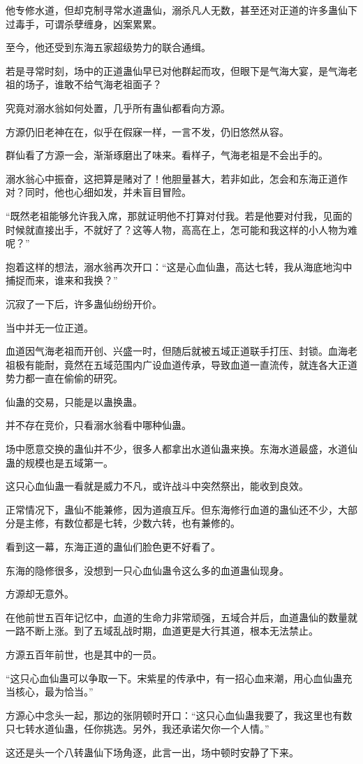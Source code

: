 \begin{this_body}
他专修水道，但却克制寻常水道蛊仙，溺杀凡人无数，甚至还对正道的许多蛊仙下过毒手，可谓杀孽缠身，凶案累累。

至今，他还受到东海五家超级势力的联合通缉。

若是寻常时刻，场中的正道蛊仙早已对他群起而攻，但眼下是气海大宴，是气海老祖的场子，谁敢不给气海老祖面子？

究竟对溺水翁如何处置，几乎所有蛊仙都看向方源。

方源仍旧老神在在，似乎在假寐一样，一言不发，仍旧悠然从容。

群仙看了方源一会，渐渐琢磨出了味来。看样子，气海老祖是不会出手的。

溺水翁心中振奋，这把算是赌对了！他胆量甚大，若非如此，怎会和东海正道作对？同时，他也心细如发，并未盲目冒险。

“既然老祖能够允许我入席，那就证明他不打算对付我。若是他要对付我，见面的时候就直接出手，不就好了？这等人物，高高在上，怎可能和我这样的小人物为难呢？”

抱着这样的想法，溺水翁再次开口：“这是心血仙蛊，高达七转，我从海底地沟中捕捉而来，谁来和我换？”

沉寂了一下后，许多蛊仙纷纷开价。

当中并无一位正道。

血道因气海老祖而开创、兴盛一时，但随后就被五域正道联手打压、封锁。血海老祖极有能耐，竟然在五域范围内广设血道传承，导致血道一直流传，就连各大正道势力都一直在偷偷的研究。

仙蛊的交易，只能是以蛊换蛊。

并不存在竞价，只看溺水翁看中哪种仙蛊。

场中愿意交换的蛊仙并不少，很多人都拿出水道仙蛊来换。东海水道最盛，水道仙蛊的规模也是五域第一。

这只心血仙蛊一看就是威力不凡，或许战斗中突然祭出，能收到良效。

正常情况下，蛊仙不能兼修，因为道痕互斥。但东海修行血道的蛊仙还不少，大部分是主修，有数位都是七转，少数六转，也有兼修的。

看到这一幕，东海正道的蛊仙们脸色更不好看了。

东海的隐修很多，没想到一只心血仙蛊令这么多的血道蛊仙现身。

方源却无意外。

在他前世五百年记忆中，血道的生命力非常顽强，五域合并后，血道蛊仙的数量就一路不断上涨。到了五域乱战时期，血道更是大行其道，根本无法禁止。

方源五百年前世，也是其中的一员。

“这只心血仙蛊可以争取一下。宋紫星的传承中，有一招心血来潮，用心血仙蛊充当核心，最为恰当。”

方源心中念头一起，那边的张阴顿时开口：“这只心血仙蛊我要了，我这里也有数只七转水道仙蛊，任你挑选。另外，我还承诺欠你一个人情。”

这还是头一个八转蛊仙下场角逐，此言一出，场中顿时安静了下来。

\end{this_body}

